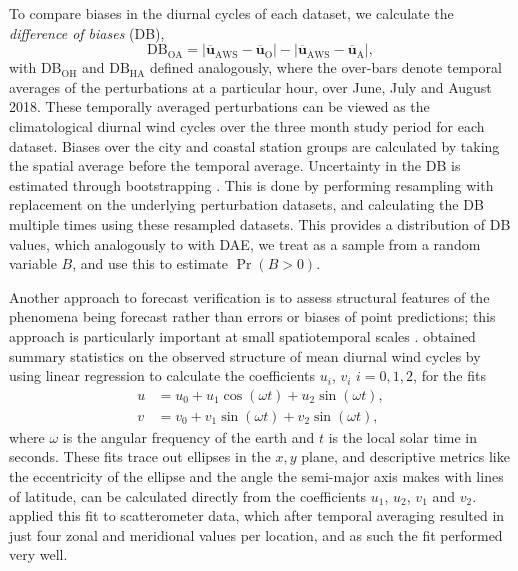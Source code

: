 \documentclass[twocol]{ametsoc}
\DeclareMathOperator{\pr}{Pr}
\begin{document}
To compare biases in the diurnal cycles of each dataset, we calculate the \textit{difference of biases} (DB),
\begin{equation}
\text{DB}_{\text{OA}} = \left\lvert \overline{\boldsymbol{u}}_{\text{AWS}}-\overline{\boldsymbol{u}}_{\text{O}} \right\rvert - \left\lvert \overline{\boldsymbol{u}}_{\text{AWS}}-\overline{\boldsymbol{u}}_{\text{A}} \right\rvert,
\end{equation}
with $\text{DB}_{\text{OH}}$ and $\text{DB}_{\text{HA}}$ defined analogously, where the over-bars denote temporal averages of the perturbations at a particular hour, over June, July and August 2018. These temporally averaged perturbations can be viewed as the climatological diurnal wind cycles over the three month study period for each dataset. Biases over the city and coastal station groups are calculated by taking the spatial average before the temporal average. Uncertainty in the DB is estimated through bootstrapping \citep{efron79}. This is done by performing resampling with replacement on the underlying perturbation datasets, and calculating the DB multiple times using these resampled datasets. This provides a distribution of DB values, which analogously to with DAE, we treat as a sample from a random variable $B$, and use this to estimate $\pr\left(B > 0\right)$.

Another approach to forecast verification is to assess structural features of the phenomena being forecast rather than errors or biases of point predictions; this approach is particularly important at small spatiotemporal scales \citep[e.g.][]{mass02, rife05}. \citet{gille05} obtained summary statistics on the observed structure of mean diurnal wind cycles by using linear regression to calculate the coefficients $u_i$, $v_i$ $i=0,1,2$, for the fits 
\begin{align}
u &= u_0 + u_1 \cos(\omega t) + u_2 \sin(\omega t), \label{Eq:u_h} \\
v &= v_0 + v_1 \sin(\omega t) + v_2 \sin(\omega t), \label{Eq:v_h}
\end{align}
where $\omega$ is the angular frequency of the earth and $t$ is the local solar time in seconds. These fits trace out ellipses in the $x,y$ plane, and descriptive metrics like the eccentricity of the ellipse and the angle the semi-major axis makes with lines of latitude, can be calculated directly from the coefficients $u_1$, $u_2$, $v_1$ and $v_2$. \citet{gille05} applied this fit to scatterometer data, which after temporal averaging resulted in just four zonal and meridional values per location, and as such the fit performed very well.  
\end{document}
